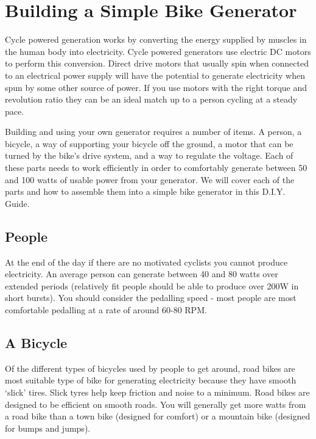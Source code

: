 \documentclass{article}
\theoremstyle{definition}
\theoremstyle{definition}
\theoremstyle{remark}
\begin{document}


\newpage

\section{Building a Simple Bike Generator} %
\label{sec:building_a_simple_bike_generator}

  Cycle powered generation works by converting the energy supplied by muscles in the human body into electricity. Cycle powered generators use electric DC motors to perform this conversion. Direct drive motors that usually spin when connected to an electrical power supply will have the potential to generate electricity when spun by some other source of power. If you use motors with the right torque and revolution ratio they can be an ideal match up to a person cycling at a steady pace.

  Building and using your own generator requires a number of items. A person, a bicycle, a way of supporting your bicycle off the ground, a motor that can be turned by the bike’s drive system, and a way to regulate the voltage. Each of these parts needs to work efficiently in order to comfortably generate between 50 and 100 watts of usable power from your generator. We will cover each of the parts and how to assemble them into a simple bike generator in this D.I.Y. Guide.

  \subsection{People} %
  \label{sub:people}

    At the end of the day if there are no motivated cyclists you cannot produce electricity. An average person can generate between 40 and 80 watts over extended periods (relatively fit people should be able to produce over 200W in short bursts). You should consider the pedalling speed - most people are most comfortable pedalling at a rate of around 60-80 RPM.
  

  \subsection{A Bicycle} %
  \label{sub:a_bicycle}

    Of the different types of bicycles used by people to get around, road bikes are most suitable type of bike for generating electricity because they have smooth ‘slick’ tires. Slick tyres help keep friction and noise to a minimum. Road bikes are designed to be efficient on smooth roads. You will generally get more watts from a road bike than a town bike (designed for comfort) or a mountain bike (designed for bumps and jumps).
  
\end{document}
